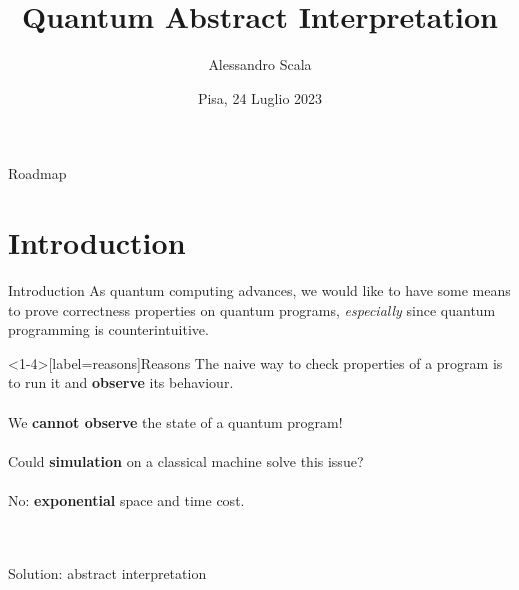 \documentclass[11pt,svgnames,smaller,aspectratio=43,english]{beamer}
\title{Quantum Abstract Interpretation}
\author{Alessandro Scala}
\institute[Università di Pisa]{Università di Pisa\\Dipartimento di Informatica}
\date{Pisa, 24 Luglio 2023}
\begin{document}
\begin{frame} 
	\titlepage
\end{frame}




\begin{frame}{Roadmap}
	\tableofcontents
\end{frame}

\section{Introduction}
\begin{frame}{Introduction}
	As quantum computing advances, we would like to have some means to prove correctness properties on quantum programs, \emph{especially} since quantum programming is counterintuitive.\\
\end{frame}

\begin{frame}<1-4>[label=reasons]{Reasons}
	The naive way to check properties of a program is to run it and \textbf<2->{observe} its behaviour.\\\;\\
	\pause
	\alert{We \textbf{cannot observe} the state of a quantum program!}\\\;\\
	\pause
	Could \textbf{simulation} on a classical machine solve this issue?\\\;\\
	\pause
	\alert{No: \textbf{exponential} space and time cost.}\\\;\\\;\\
	\pause
	\begin{center}
		\large \color{blue} Solution: abstract interpretation
	\end{center}
\end{frame}
\end{document}
